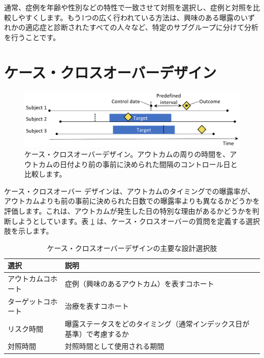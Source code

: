 \documentclass[
  11pt]{book}
\theoremstyle{definition}
\theoremstyle{definition}
\theoremstyle{definition}
\theoremstyle{definition}
\theoremstyle{remark}
\begin{document}
通常、症例を年齢や性別などの特性で一致させて対照を選択し、症例と対照を比較しやすくします。もう1つの広く行われている方法は、興味のある曝露のいずれかの適応症と診断されたすべての人々など、特定のサブグループに分けて分析を行うことです。

\section{ケース・クロスオーバーデザイン}\label{ux30b1ux30fcux30b9ux30afux30edux30b9ux30aaux30fcux30d0ux30fcux30c7ux30b6ux30a4ux30f3}


\begin{figure}[h]

{\centering \includegraphics[width=0.9\linewidth]{images/PopulationLevelEstimation/caseCrossover} 

}

\caption{ケース・クロスオーバーデザイン。アウトカムの周りの時間を、アウトカムの日付より前の事前に決められた間隔のコントロール日と比較します。}\label{fig:caseCrossover}
\end{figure}

ケース・クロスオーバー \citep{maclure_1991} デザインは、アウトカムのタイミングでの曝露率が、アウトカムよりも前の事前に決められた日数での曝露率よりも異なるかどうかを評価します。これは、アウトカムが発生した日の特別な理由があるかどうかを判断しようとしています。表 \ref{tab:ccrChoices} は、ケース・クロスオーバーの質問を定義する選択肢を示します。  

\begin{table}
\centering
\caption{\label{tab:ccrChoices}ケース・クロスオーバーデザインの主要な設計選択肢}
\centering
\begin{tabular}[t]{l>{\raggedright\arraybackslash}p{9cm}}
\toprule
選択 & 説明\\
\midrule
アウトカムコホート & 症例（興味のあるアウトカム）を表すコホート\\
ターゲットコホート & 治療を表すコホート\\
リスク時間 & 曝露ステータスをどのタイミング（通常インデックス日が基準）で考慮するか\\
対照時間 & 対照時間として使用される期間\\
\bottomrule
\end{tabular}
\end{table}
\end{document}
